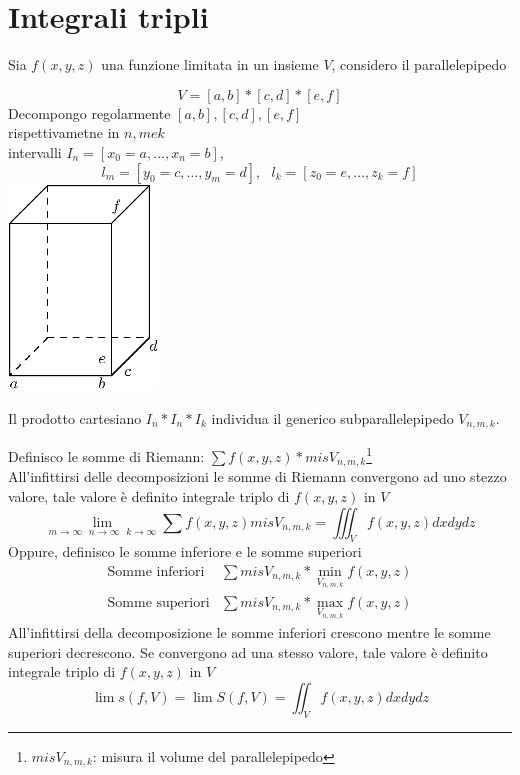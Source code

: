 \section{Integrali tripli}
\begin{defi}
  Sia $f(x,y,z)$ una funzione limitata in un insieme $V$, considero il parallelepipedo
  \begin{multicols}{2}
    \begin{equation*}
      V=[a,b]*[c,d]*[e,f]
    \end{equation*}
    Decompongo regolarmente $[a,b],[c,d],[e,f]$\\
    rispettivametne in $n,m e k$\\
    intervalli $I_n=[x_0=a,\dots,x_n=b]$,
    \begin{equation*}
      l_m=[y_0=c,\dots,y_m=d],\text{ } l_k=[z_0=e,\dots,z_k=f]
    \end{equation*}
    \includegraphics[width=4cm]{img/finiti/rettangolo.eps}
  \end{multicols}
  Il prodotto cartesiano $I_n*I_n*I_k$ individua il generico subparallelepipedo $V_{n,m,k}$.
\end{defi}
\clearpage
Definisco le somme di Riemann: $\sum f(x,y,z)*misV_{n,m,k}$\footnote{$misV_{n,m,k}$: misura il
  volume del parallelepipedo}\\
All'infittirsi delle decomposizioni le somme di Riemann convergono ad uno stezzo valore, tale
valore è definito {\color{red}integrale triplo} di $f(x,y,z)$ in $V$
\begin{equation*}
  \lim_{m\to \infty\text{ } n \to \infty \text{ } k\to \infty}\sum f(x,y,z) misV_{n,m,k}=\iiint_V f(x,y,z)dxdydz
\end{equation*}
Oppure, definisco le somme inferiore e le somme superiori
\begin{equation*}
  \begin{matrix}
    \text{Somme inferiori} &\sum misV_{n,m,k}*\min_{V_{n,m,k}}f(x,y,z)\\
    \text{Somme superiori} &\sum misV_{n,m,k}*\max_{V_{n,m,k}}f(x,y,z)
  \end{matrix}
\end{equation*}
All'infittirsi della decomposizione le somme inferiori crescono mentre le somme superiori
decrescono. Se convergono ad una stesso valore, tale valore è definito {\color{red}integrale triplo}
di $f(x,y,z)$ in $V$
\begin{equation*}
  \lim s(f,V)= \lim S(f,V)= \iint_V f(x,y,z) dxdydz
\end{equation*}
